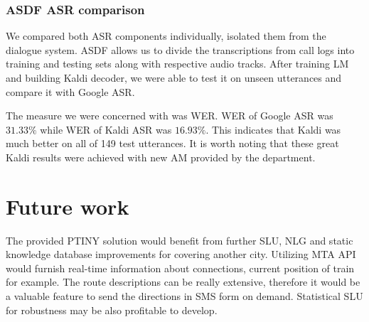 
\subsubsection{\ac{ASDF} \ac{ASR} comparison}

We compared both \ac{ASR} components individually, isolated them from the dialogue system.
\ac{ASDF} allows us to divide the transcriptions from call logs into training and testing sets along with respective audio tracks.
After training \ac{LM} and building Kaldi decoder, we were able to test it on unseen utterances and compare it with Google \ac{ASR}.

The measure we were concerned with was \acf{WER}.
\ac{WER} of Google \ac{ASR} was $31.33\%$ while \ac{WER} of Kaldi \ac{ASR} was $16.93\%$.
This indicates that Kaldi was much better on all of 149 test utterances.
It is worth noting that these great Kaldi results were achieved with new \ac{AM} provided by the department.

\section{Future work}

The provided \ac{PTINY} solution would benefit from further \ac{SLU}, \ac{NLG}  and static knowledge database improvements for covering another city.
Utilizing \ac{MTA} \ac{API} would furnish real-time information about connections, current position of train for example.
The route descriptions can be really extensive, therefore it would be a valuable feature to send the directions in SMS form on demand.
Statistical \ac{SLU} for robustness may be also profitable to develop.
